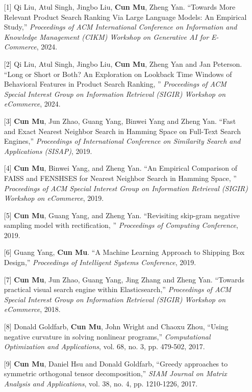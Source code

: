 \documentclass[11pt,a4paper,roman]{moderncv} %
\begin{document}
\vspace*{1mm}
\begin{enumerate}
\item[{[1]}] Qi Liu, Atul Singh, Jingbo Liu, {\bfseries Cun Mu}, Zheng Yan. ``Towards More Relevant Product Search Ranking Via Large Language Models: An Empirical Study,'' {\em Proceedings of ACM International Conference on Information and Knowledge Management (CIKM) Workshop on Generative AI for E-Commerce}, 2024.
\item[{[2]}] Qi Liu, Atul Singh, Jingbo Liu, {\bfseries Cun Mu}, Zheng Yan and Jan Peterson. ``Long or Short or Both? An Exploration on Lookback Time Windows of Behavioral Features in Product Search Ranking, '' {\em Proceedings of ACM Special Interest Group on Information Retrieval (SIGIR) Workshop on eCommerce}, 2024.
\item[{[3]}] {\bfseries Cun Mu}, Jun Zhao, Guang Yang, Binwei Yang and Zheng Yan. ``Fast and Exact Nearest Neighbor Search in Hamming Space on Full-Text Search Engines,'' {\em Proceedings of International Conference on Similarity Search and Applications (SISAP)}, 2019.
\item[{[4]}] {\bfseries Cun Mu}, Binwei Yang, and Zheng Yan. ``An Empirical Comparison of FAISS and FENSHSES for Nearest Neighbor Search in Hamming Space, '' {\em Proceedings of ACM Special Interest Group on Information Retrieval (SIGIR) Workshop on eCommerce}, 2019.
\item[{[5]}] {\bfseries Cun Mu}, Guang Yang, and Zheng Yan. ``Revisiting skip-gram negative sampling model with rectification, '' {\em Proceedings of Computing Conference}, 2019.	
\item[{[6]}] Guang Yang, {\bfseries Cun Mu}. ``A Machine Learning Approach to Shipping Box Design,'' {\em Proceedings of Intelligent Systems Conference}, 2019.
\vspace*{2mm}
\item[{[7]}] {\bfseries Cun Mu}, Jun Zhao, Guang Yang, Jing Zhang and Zheng Yan. ``Towards practical visual search engine within Elasticsearch,'' {\em Proceedings of ACM Special Interest Group on Information Retrieval (SIGIR) Workshop on eCommerce}, 2018.
\vspace*{2mm}
\item[{[8]}] Donald Goldfarb, {\bfseries Cun Mu}, John Wright and Chaoxu Zhou, ``Using negative curvature in solving nonlinear programs,'' {\em Computational Optimization and Applications}, vol. 68, no. 3, pp. 479-502, 2017.
\vspace*{2mm}
\item[{[9]}] {\bfseries Cun Mu}, Daniel Hsu and Donald Goldfarb, ``Greedy approaches to symmetric orthogonal tensor decomposition,'' {\em SIAM Journal on Matrix Analysis and Applications}, vol. 38, no. 4, pp. 1210-1226, 2017.

\end{enumerate}
\end{document}
